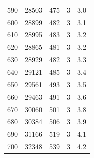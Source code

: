 \documentclass[
  bibliography=totoc,     %
  captions=tableheading,  %
  titlepage=firstiscover, %
]{scrartcl}
\begin{document}
\begin{table}
\begin{tabular}{S[table-format=3.0] S[table-format=5.0] S[table-format=3.0] S[table-format=1.0] S}
    590 & 28503 & 475 & 3 & 3.0 \\
    600 & 28899 & 482 & 3 & 3.1 \\
    610 & 28995 & 483 & 3 & 3.2 \\
    620 & 28865 & 481 & 3 & 3.2 \\
    630 & 28929 & 482 & 3 & 3.3 \\
    640 & 29121 & 485 & 3 & 3.4 \\
    650 & 29561 & 493 & 3 & 3.5 \\
    660 & 29463 & 491 & 3 & 3.6 \\
    670 & 30060 & 501 & 3 & 3.8 \\
    680 & 30384 & 506 & 3 & 3.9 \\
    690 & 31166 & 519 & 3 & 4.1 \\
    700 & 32348 & 539 & 3 & 4.2 \\
    \bottomrule
  \end{tabular}
\end{table}
\clearpage
\end{document}
